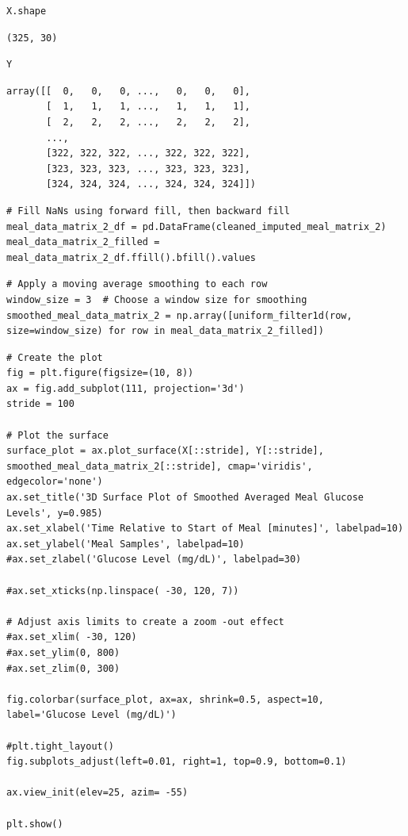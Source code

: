 \begin{verbatim}
X.shape
\end{verbatim}

\begin{verbatim}
(325, 30)
\end{verbatim}

\begin{verbatim}
Y
\end{verbatim}

\begin{verbatim}
array([[  0,   0,   0, ...,   0,   0,   0],
       [  1,   1,   1, ...,   1,   1,   1],
       [  2,   2,   2, ...,   2,   2,   2],
       ...,
       [322, 322, 322, ..., 322, 322, 322],
       [323, 323, 323, ..., 323, 323, 323],
       [324, 324, 324, ..., 324, 324, 324]])
\end{verbatim}

\begin{verbatim}
# Fill NaNs using forward fill, then backward fill
meal_data_matrix_2_df = pd.DataFrame(cleaned_imputed_meal_matrix_2)
meal_data_matrix_2_filled = meal_data_matrix_2_df.ffill().bfill().values
\end{verbatim}

\begin{verbatim}
# Apply a moving average smoothing to each row
window_size = 3  # Choose a window size for smoothing
smoothed_meal_data_matrix_2 = np.array([uniform_filter1d(row, size=window_size) for row in meal_data_matrix_2_filled])
\end{verbatim}

\begin{verbatim}
# Create the plot
fig = plt.figure(figsize=(10, 8))
ax = fig.add_subplot(111, projection='3d')
stride = 100

# Plot the surface
surface_plot = ax.plot_surface(X[::stride], Y[::stride], smoothed_meal_data_matrix_2[::stride], cmap='viridis', edgecolor='none')
ax.set_title('3D Surface Plot of Smoothed Averaged Meal Glucose Levels', y=0.985)
ax.set_xlabel('Time Relative to Start of Meal [minutes]', labelpad=10)
ax.set_ylabel('Meal Samples', labelpad=10)
#ax.set_zlabel('Glucose Level (mg/dL)', labelpad=30)

#ax.set_xticks(np.linspace( -30, 120, 7))

# Adjust axis limits to create a zoom -out effect
#ax.set_xlim( -30, 120)
#ax.set_ylim(0, 800)
#ax.set_zlim(0, 300)

fig.colorbar(surface_plot, ax=ax, shrink=0.5, aspect=10, label='Glucose Level (mg/dL)')

#plt.tight_layout()
fig.subplots_adjust(left=0.01, right=1, top=0.9, bottom=0.1)

ax.view_init(elev=25, azim= -55)

plt.show()
\end{verbatim}

